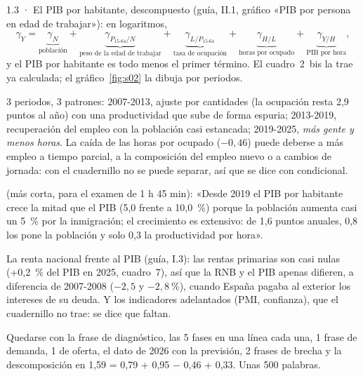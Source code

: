 \begin{complemento}{1.3 · El PIB por habitante, descompuesto}
 (guía, II.1, gráfico «PIB por persona en edad de trabajar»): en logaritmos,
\[
\gamma_Y=\underbrace{\gamma_N}_{\text{población}}+\underbrace{\gamma_{P_{15\text{-}64}/N}}_{\text{peso de la edad de trabajar}}+\underbrace{\gamma_{L/P_{15\text{-}64}}}_{\text{tasa de ocupación}}+\underbrace{\gamma_{H/L}}_{\text{horas por ocupado}}+\underbrace{\gamma_{Y/H}}_{\text{PIB por hora}} ,
\]
y el PIB por habitante es todo menos el primer término. El cuadro~2~bis la trae ya calculada; el gráfico~\ref{fig:s02} la dibuja por periodos.

\begin{figuracaja}
\caption{Descomposición del crecimiento del PIB por periodos (puntos al año)}\label{fig:s02}
\end{figuracaja}

 3 periodos, 3 patrones: 2007-2013, ajuste por cantidades (la ocupación resta 2,9 puntos al año) con una productividad que sube de forma espuria; 2013-2019, recuperación del empleo con la población casi estancada; 2019-2025, \emph{más gente y menos horas}. La caída de las horas por ocupado ($-0{,}46$) puede deberse a más empleo a tiempo parcial, a la composición del empleo nuevo o a cambios de jornada: con el cuadernillo no se puede separar, así que se dice con condicional.

 (más corta, para el examen de 1 h 45 min): «Desde 2019 el PIB por habitante crece la mitad que el PIB (5,0 frente a 10,0~\%) porque la población aumenta casi un 5~\% por la inmigración; el crecimiento es extensivo: de 1,6 puntos anuales, 0,8 los pone la población y solo 0,3 la productividad por hora».

 La renta nacional frente al PIB (guía, I.3): las rentas primarias son casi nulas (+0,2~\% del PIB en 2025, cuadro~7), así que la RNB y el PIB apenas difieren, a diferencia de 2007-2008 ($-2{,}5$ y $-2{,}8~\%$), cuando España pagaba al exterior los intereses de su deuda. Y los indicadores adelantados (PMI, confianza), que el cuadernillo no trae: se dice que faltan.

 Quedarse con la frase de diagnóstico, las 5 fases en una línea cada una, 1 frase de demanda, 1 de oferta, el dato de 2026 con la previsión, 2 frases de brecha y la descomposición en 1,59 = 0,79 + 0,95 $-$ 0,46 + 0,33. Unas 500 palabras.
\end{complemento}
